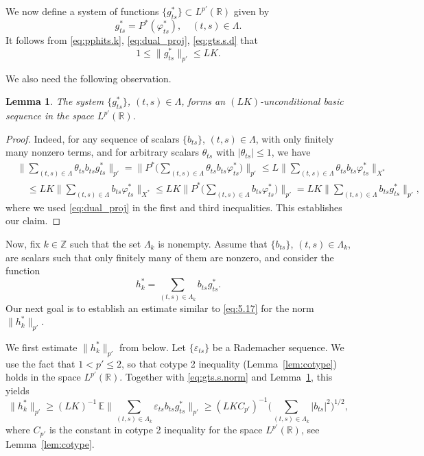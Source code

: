 \documentclass[reqno,a4paper,12pt]{amsart}
\numberwithin{equation}{section}
\numberwithin{figure}{section}
\newcommand\R{\mathbb{R}}
\newcommand\Z{\mathbb{Z}}
\newcommand\Lam{\Lambda}
\newcommand\1{\mathds{1}}
\newcommand\eps{\varepsilon}
\newcommand{\pphi}{\varphi}
\renewcommand\le{\leqslant}
\renewcommand\ge{\geqslant}
\newcommand\sbt{\subset}
\theoremstyle{plain}
\newtheorem{lem}[thm]{Lemma}
\newcommand{\lemref}[1]{Lemma~\ref{#1}}
\theoremstyle{definition}
\begin{document}
We now define a system of functions $\{ g_{ts}^* \} \sbt L^{p'}(\R)$ given by
\begin{equation}
\label{eq:gts.s.d}
g_{ts}^*=P^*(\pphi_{ts}^*), \quad (t,s)\in\Lambda. 
\end{equation}
It follows from \eqref{eq:pphits.k}, \eqref{eq:dual_proj}, \eqref{eq:gts.s.d} that
\begin{equation}
\label{eq:gts.s.norm}
1 \le \|g_{ts}^*\|_{p'} \le L K.
\end{equation}

We also need the following observation.

\begin{lem}
\label{lem:dual.gts.s}
The system $\{ g_{ts}^* \}$, $(t,s) \in\Lambda$, forms an $(LK)$-unconditional 
basic sequence in the space $L^{p'}(\R)$.
\end{lem}

\begin{proof}
 Indeed, for any sequence of scalars $\{b_{ts}\}$, $(t,s)\in\Lambda$, 
 with only finitely many nonzero terms, and for arbitrary scalars
  $\theta_{ts}$ with $|\theta_{ts}|\le 1$, we have
\begin{align}
& \Big\| \sum_{(t,s)\in\Lambda} \theta_{ts} b_{ts} g^*_{ts} \Big\|_{p'} = \Big\| P^* \Big( \sum_{(t,s)\in\Lambda} \theta_{ts} b_{ts} \pphi^*_{ts} \Big)\Big\|_{p'}\le L \Big\|\sum_{(t,s)\in\Lambda} \theta_{ts} b_{ts} \pphi^*_{ts} \Big\|_{X^*}\\
&\quad \le L K \Big\| \sum_{(t,s)\in\Lambda}  b_{ts} \pphi^*_{ts} \Big\|_{X^*} \le L K \Big\|P^*\Big(\sum_{(t,s)\in\Lambda}  b_{ts} \pphi^*_{ts} \Big)\Big\|_{p'} = L K \Big\| \sum_{(t,s)\in\Lambda}  b_{ts} g^*_{ts} \Big\|_{p'},
\end{align}
where we used \eqref{eq:dual_proj} in the first and third inequalities.
This establishes our claim.
\end{proof}


Now, fix $k \in \Z$ such that the set
$\Lam_k$ is nonempty. Assume that  $\{b_{ts}\}$, $(t,s)\in\Lambda_k$, 
are scalars such that only finitely many of them are
nonzero, and consider the function
\begin{equation}
\label{eq:hks.def}
h_k^* = \sum_{(t,s)\in\Lambda_k} b_{ts}g^*_{ts}.
\end{equation}
Our next goal is to establish an estimate similar to
\eqref{eq:5.17} for the norm $\| h_k^* \|_{p'}$.

We first estimate $\|h_k^*\|_{p'}$ from below. 
Let $\{\eps_{ts}\}$ be a Rademacher sequence. We use
the fact that $1 < p' \le 2$, so that
cotype 2 inequality (\lemref{lem:cotype}) holds
in the space $L^{p'}(\R)$. Together with
\eqref{eq:gts.s.norm} and \lemref{lem:dual.gts.s}, this yields
\begin{equation}
\label{eq:belowest}
\|h_k^*\|_{p'} \ge (L K)^{-1} \,
\mathbb{E} \Big\|\sum_{(t,s)\in\Lambda_k} 
\eps_{ts}b_{ts}  g_{ts}^* \Big\|_{p'}\ge (L K C_{p'})^{-1}
\Big( \sum_{(t,s)\in\Lambda_k}|b_{ts}|^2 \Big)^{1/2},
\end{equation}
where $C_{p'}$ is the constant in cotype 2 inequality for the space $L^{p'}(\R)$, see \lemref{lem:cotype}.
\end{document}

